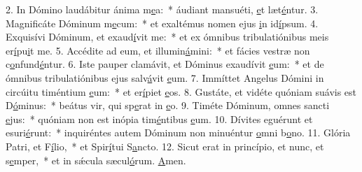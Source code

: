 2. In Dómino laudábitur ánima m\uline{e}a:~* áudiant mansuéti, \uline{e}t læt\uline{é}ntur.
3. Magnificáte Dóminum m\uline{e}cum:~* et exaltémus nomen ejus \uline{i}n id\uline{í}psum.
4. Exquisívi Dóminum, et exaud\uline{í}vit me:~* et ex ómnibus tribulatiónibus meis er\uline{í}pu\uline{i}t me.
5. Accédite ad eum, et illumin\uline{á}mini:~* et fácies vestræ non c\uline{o}nfund\uline{é}ntur.
6. Iste pauper clamávit, et Dóminus exaudívit \uline{e}um:~* et de ómnibus tribulatiónibus ejus salv\uline{á}vit \uline{e}um.
7. Immíttet Angelus Dómini in circúitu timéntium \uline{e}um:~* et er\uline{í}piet \uline{e}os.
8. Gustáte, et vidéte quóniam suávis est D\uline{ó}minus:~* beátus vir, qui sp\uline{e}rat in \uline{e}o.
9. Timéte Dóminum, omnes sancti \uline{e}jus:~* quóniam non est inópia tim\uline{é}ntibus \uline{e}um.
10. Dívites eguérunt et esuri\uline{é}runt:~* inquiréntes autem Dóminum non minuéntur \uline{o}mni b\uline{o}no.
11. Glória Patri, et F\uline{í}lio,~* et Spir\uline{í}tui S\uline{a}ncto.
12. Sicut erat in princípio, et nunc, et s\uline{e}mper,~* et in sǽcula sæcul\uline{ó}rum. \uline{A}men.
